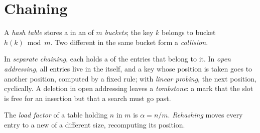 \section{Chaining}\label{sec:b1:hash-tables:chaining}

\begin{definition}\label{def:b1:hash-tables:hash-table}
A \emph{hash table} stores a  in an  of $m$ \emph{buckets}; the key $k$
belongs to bucket $h(k) \bmod m$. Two different  in the same bucket form a \emph{collision}.
\end{definition}

\begin{definition}\label{def:b1:hash-tables:collisions}
In \emph{separate chaining}, each  holds a  of the entries that belong to it.
In \emph{open addressing}, all entries live in the  itself, and a key whose position is taken
goes to another position, computed by a fixed rule; with \emph{linear probing}, the next position,
cyclically. A deletion in open addressing leaves a \emph{tombstone}: a mark that the slot is free for an
insertion but that a search must go past.
\end{definition}

\begin{definition}\label{def:b1:hash-tables:load-factor}
The \emph{load factor} of a table holding $n$  in $m$  is $\alpha = n/m$.
\emph{Rehashing} moves every entry to a new  of a different size, recomputing its position.
\end{definition}

